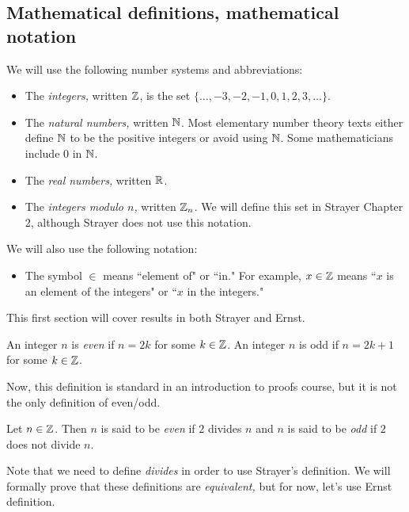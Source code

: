 \documentclass{ximera}
\begin{document}
\subsection{Mathematical definitions, mathematical notation}%
\begin{defn} We will use the following number systems and abbreviations:
\begin{itemize}
 \item  The \emph{integers,} written $\mathbb Z$, is the set $\{\dots,-3,-2,-1,0,1,2,3,\dots\}$. 
 \item The \emph{natural numbers,} written $\mathbb N$. Most elementary number theory texts either define $\mathbb N$ to be the positive integers or avoid using $\mathbb N$. Some mathematicians include $0$ in $\mathbb N$.
 \item The \emph{real numbers,} written $\mathbb R$.
 \item The \emph{integers modulo $n$,} written $\mathbb Z_n$. We will define this set in Strayer Chapter 2, although Strayer does not use this notation.
\end{itemize}
We will also use the following notation:
\begin{itemize}
 \item The symbol $\in$ means ``element of" or ``in." For example, $x\in\mathbb Z$ means ``$x$ is an element of the integers" or ``$x$ in the integers."
\end{itemize}
\end{defn}

This first section will cover results in both Strayer and Ernst.

\begin{defn}
 An integer $n$ is \emph{even} if $n=2k$ for some $k\in\mathbb Z$. An integer $n$ is odd if $n=2k+1$ for some $k\in\mathbb Z$.
\end{defn}

Now, this definition is standard in an introduction to proofs course, but it is not the only definition of even/odd.

\begin{defn}
 Let $n\in\mathbb Z$. Then $n$ is said to be \emph{even} if $2$ divides $n$ and $n$ is said to be \emph{odd} if $2$ does not divide $n$.
\end{defn}
Note that we need to define \emph{divides} in order to use Strayer's definition. We will formally prove that these definitions are \emph{equivalent,} but for now, let's use Ernst definition.
 
\end{document}
